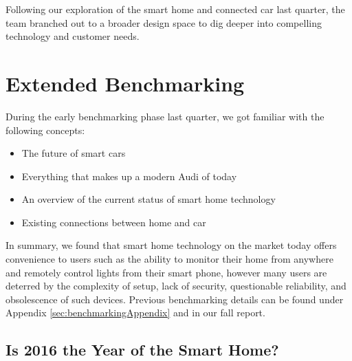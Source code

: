 
Following our exploration of the smart home and connected car last quarter, the team branched out to a broader design space to dig deeper into compelling technology and customer needs.
\section{Extended Benchmarking}
\label{sec:benchmarking}

During the early benchmarking phase last quarter, we got familiar with the following concepts:

\begin{itemize}
    \item The future of smart cars
    \item Everything that makes up a modern Audi of today
    \item An overview of the current status of smart home technology
    \item Existing connections between home and car
\end{itemize}

\noindent
In summary, we found that smart home technology on the market today offers convenience to users such as the ability to monitor their home from anywhere and remotely control lights from their smart phone, however many users are deterred by the complexity of setup, lack of security, questionable reliability, and obsolescence of such devices. Previous benchmarking details can be found under Appendix \ref{sec:benchmarkingAppendix} and in our fall report.

\subsection{Is 2016 the Year of the Smart Home?}


